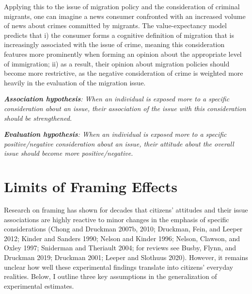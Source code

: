 \documentclass[
  12pt,
]{article}
\begin{document}
Applying this to the issue of migration policy and the consideration of criminal migrants, one can imagine a news consumer confronted with an increased volume of news about crimes committed by migrants. The value-expectancy model predicts that i) the consumer forms a cognitive definition of migration that is increasingly associated with the issue of crime, meaning this consideration features more prominently when forming an opinion about the appropriate level of immigration; ii) as a result, their opinion about migration policies should become more restrictive, as the negative consideration of crime is weighted more heavily in the evaluation of the migration issue.

\medskip

\noindent \textit{\textbf{Association hypothesis}: When an individual is exposed more to a specific consideration about an issue, their association of the issue with this consideration should be strengthened.}

\noindent \textit{\textbf{Evaluation hypothesis}: When an individual is exposed more to a specific positive/negative consideration about an issue, their attitude about the overall issue should become more positive/negative.}

\hypertarget{framing-limits}{%
\section{Limits of Framing Effects}\label{framing-limits}}

Research on framing has shown for decades that citizens' attitudes and their issue associations are highly reactive to minor changes in the emphasis of specific considerations (Chong and Druckman 2007b, 2010; Druckman, Fein, and Leeper 2012; Kinder and Sanders 1990; Nelson and Kinder 1996; Nelson, Clawson, and Oxley 1997; Sniderman and Theriault 2004; for reviews see Busby, Flynn, and Druckman 2019; Druckman 2001; Leeper and Slothuus 2020). However, it remains unclear how well these experimental findings translate into citizens' everyday realities. Below, I outline three key assumptions in the generalization of experimental estimates.
\end{document}
